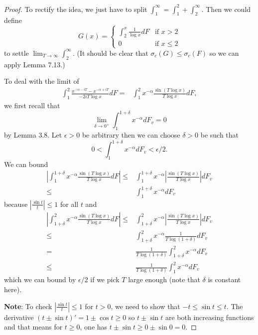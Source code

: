\documentclass[12pt]{article}
\newcommand{\Abs}[1]{\left| #1 \right|}
\begin{document}
\begin{proof}
To rectify the idea, we just have to split $\int_1^\infty = \int_1^2 + \int_2^\infty$. Then we could define
$$G(x) = \begin{cases} \int_2^x \frac{1}{\log x} dF &\text{if } x > 2 \\ 0 &\text{if } x \leq 2 \end{cases}$$
to settle $\lim_{T \rightarrow \infty} \int_2^\infty$. (It should be clear that $\sigma_c(G) \leq \sigma_c(F)$ so we can apply Lemma 7.13.)

To deal with the limit of
\begin{align*}
\int_1^2 \frac{x^{-\alpha-iT} - x^{-\alpha+iT}}{- 2 i T \log x} dF =& \int_1^2 x^{-\alpha} \frac{\sin(T \log x)}{T \log x} dF,
\end{align*}
we first recall that
$$\lim_{\delta \rightarrow 0^+} \int_1^{1 + \delta} x^{-\alpha} dF_v = 0$$
by Lemma 3.8. Let $\epsilon > 0$ be arbitrary then we can choose $\delta > 0$ be such that
$$0 < \int_1^{1 + \delta} x^{-\alpha} dF_v < \epsilon / 2.$$
We can bound
\begin{align*}
\Abs{ \int_1^{1 + \delta} x^{-\alpha} \frac{\sin(T \log x)}{T \log x} dF } \leq& \int_1^{1 + \delta} x^{-\alpha} \Abs{ \frac{\sin(T \log x)}{T \log x} } dF_v \\
\leq& \int_1^{1 + \delta} x^{-\alpha} dF_v
\end{align*}
because $\Abs{ \frac{\sin t}{t} } \leq 1$ for all $t$ and
\begin{align*}
\Abs{ \int_{1 + \delta}^2 x^{-\alpha} \frac{\sin(T \log x)}{T \log x} dF } \leq& \int_{1 + \delta}^2 x^{-\alpha} \Abs{ \frac{\sin(T \log x)}{T \log x} } dF_v\\
\leq& \int_{1 + \delta}^2 x^{-\alpha} \frac{1}{T \log(1 + \delta)} dF_v \\
=& \frac{1}{T \log(1 + \delta)} \int_{1 + \delta}^2 x^{-\alpha} dF_v \\
\leq& \frac{1}{T \log(1 + \delta)} \int_1^2 x^{-\alpha} dF_v 
\end{align*}
which we can bound by $\epsilon / 2$ if we pick $T$ large enough (note that $\delta$ is constant here).

\textbf{Note}: To check $\Abs{ \frac{\sin t}{t} } \leq 1$ for $t > 0$, we need to show that $-t \leq \sin t \leq t$. The derivative $(t \pm \sin t)' = 1 \pm \cos t \geq 0$ so $t \pm \sin t$ are both increasing functions and that means for $t \geq 0$, one has $t \pm \sin t \geq 0 \pm \sin 0 = 0$.
\end{proof}

\unless\ifdefined\IsMainDocument
\end{document}
